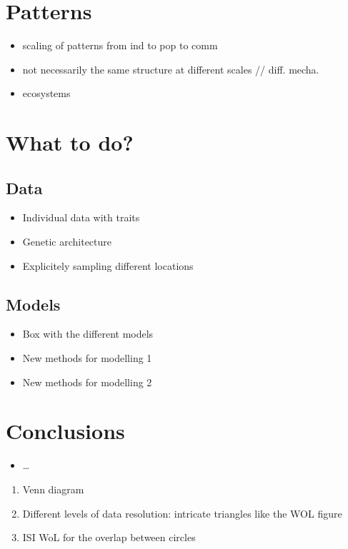 \documentclass[11pt,oneside]{scrartcl}
\begin{document}
\section{Patterns}

\begin{itemize}
	\item scaling of patterns from ind to pop to comm
	\item not necessarily the same structure at different scales // diff. mecha.
	\item ecosystems
\end{itemize}

\section{What to do?}

\subsection{Data}

\begin{itemize}
	\item Individual data with traits
	\item Genetic architecture
	\item Explicitely sampling different locations
\end{itemize}

\subsection{Models}

\begin{itemize}
	\item Box with the different models
	\item New methods for modelling 1
	\item New methods for modelling 2
\end{itemize}

\section{Conclusions}

\begin{itemize}
	\item \ldots
\end{itemize}

\printbibliography

\begin{enumerate}
	\item Venn diagram
	\item Different levels of data resolution: intricate triangles like the WOL figure
	\item ISI WoL for the overlap between circles
\end{enumerate}
\end{document}
